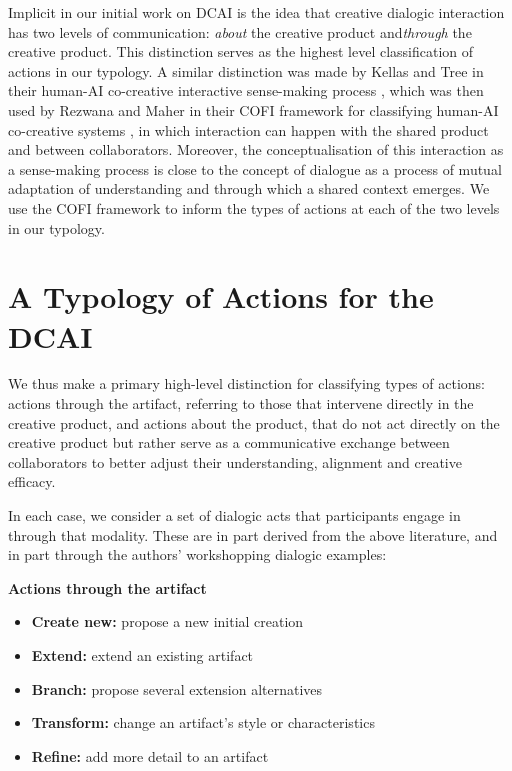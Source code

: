 \documentclass[acmlarge, nonacm, screen]{acmart} %
\begin{document}
Implicit in our initial work on DCAI \citep{bownspeculative2020} is the idea that creative dialogic interaction has two levels of communication: \emph{about} the creative product and\emph{through} the creative product. This distinction serves as the highest level classification of actions in our typology. A similar distinction was made by Kellas and Tree in their human-AI co-creative interactive sense-making process \cite{Kellas2005-lc}, which was then used by Rezwana and Maher in their COFI framework for classifying human-AI co-creative systems \cite{Rezwana_undated-dr}, in which interaction can happen with the shared product and between collaborators. Moreover, the conceptualisation of this interaction as a sense-making process is close to the concept of dialogue as a process of mutual adaptation of understanding and through which a shared context emerges. We use the COFI framework to inform the types of actions at each of the two levels in our typology. 
    
\section{A Typology of Actions for the DCAI}

We thus make a primary high-level distinction for classifying types of actions: actions through the artifact, referring to those that intervene directly in the creative product, and actions about the product, that do not act directly on the creative product but rather serve as a communicative exchange between collaborators to better adjust their understanding, alignment and creative efficacy. 

In each case, we consider a set of dialogic acts that participants engage in through that modality. These are in part derived from the above literature, and in part through the authors' workshopping dialogic examples:

\textbf{Actions through the artifact}


\begin{itemize}

  \item \relax \textbf{Create new:} propose a new initial creation
  \item \relax \textbf{Extend:} extend an existing artifact
   \item \relax \textbf{Branch:} propose several extension alternatives
  \item \relax \textbf{Transform:} change an artifact's style or characteristics
  \item \relax \textbf{Refine:} add more detail to an artifact 
 
\end{itemize}
\end{document}
